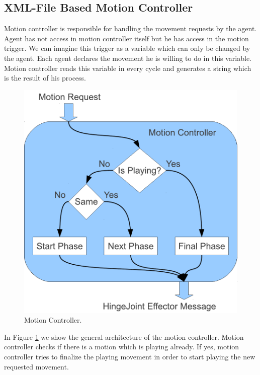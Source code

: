 \subsection{XML-File Based Motion Controller}
Motion controller is responsible for handling the movement requests by the agent. Agent has not access in motion controller itself but he has access in the motion trigger. We can imagine this trigger as a variable which can only be changed by the agent. Each agent declares the movement he is willing to do in this variable.
Motion controller reads this variable in every cycle and generates a string which is the result of his process.
\begin{figure}[htb!]
\centering
  \includegraphics[scale=0.6]{Chapter3/figures/MotionController.pdf}
  \caption{Motion Controller.}
  \label{fig:MotionController}
\end{figure}
In Figure \ref{fig:MotionController} we show the general architecture of the motion controller. Motion controller checks if there is a motion which is playing already. If yes, motion controller tries to finalize the playing movement in order to start playing the new requested movement.

